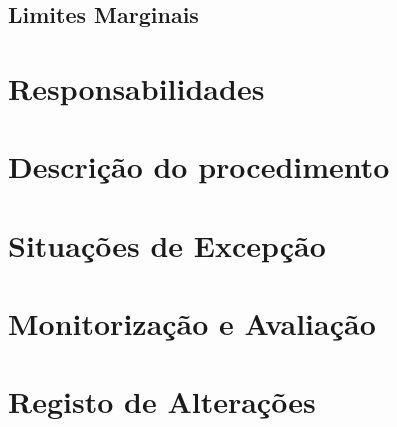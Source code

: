     \subsection{Limites Marginais}\label{subsec:limites-marginais}

\section{Responsabilidades}\label{sec:responsabilidades}

\section{Descrição do procedimento}\label{sec:descricao-do-procedimento}

\section{Situações de Excepção}\label{sec:situacoes-de-excepcao}

\section{Monitorização e Avaliação}\label{sec:monitorizacao-e-avaliacao}

\printbibliography[title={Documentos de Referência}]

\newpage

\section{Registo de Alterações}\label{sec:registo-de-alteracoes}
\stoptocentries%

\titleformat{\section}[block]{\normalfont\Large\bfseries}{}{0em}{}
\titleformat{\subsection}[block]{\normalfont\large\bfseries}{}{0em}{}


\titleformat{\section}[block]{\normalfont\Large\bfseries}{\thesection}{1em}{}
\titleformat{\subsection}[block]{\normalfont\large\bfseries}{\thesubsection}{1em}{}

\starttocentries%

